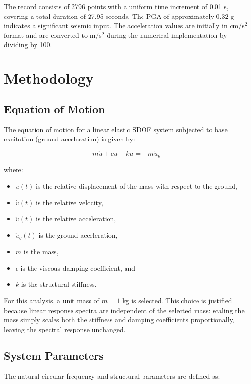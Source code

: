 ﻿\documentclass[12pt]{article}
\begin{document}
The record consists of 2796 points with a uniform time increment of 0.01 s, covering a total duration of 27.95 seconds. The PGA of approximately 0.32 g indicates a significant seismic input. The acceleration values are initially in cm/s\(^2\) format and are converted to m/s\(^2\) during the numerical implementation by dividing by 100.

\section{Methodology}

\subsection{Equation of Motion}

The equation of motion for a linear elastic SDOF system subjected to base excitation (ground acceleration) is given by:

\begin{equation}
m \ddot{u} + c \dot{u} + k u = -m \ddot{u}_g
\label{eq:eom}
\end{equation}

where:
\begin{itemize}
    \item \(u(t)\) is the relative displacement of the mass with respect to the ground,
    \item \(\dot{u}(t)\) is the relative velocity,
    \item \(\ddot{u}(t)\) is the relative acceleration,
    \item \(\ddot{u}_g(t)\) is the ground acceleration,
    \item \(m\) is the mass,
    \item \(c\) is the viscous damping coefficient, and
    \item \(k\) is the structural stiffness.
\end{itemize}

For this analysis, a unit mass of \(m = 1\) kg is selected. This choice is justified because linear response spectra are independent of the selected mass; scaling the mass simply scales both the stiffness and damping coefficients proportionally, leaving the spectral response unchanged.

\subsection{System Parameters}

The natural circular frequency and structural parameters are defined as:
\end{document}
